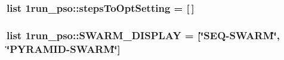 \hypertarget{namespace1run__pso_89359e300d669e1cf00ab2f5ca28347c}{
\subsubsection{\setlength{\rightskip}{0pt plus 5cm}list 1run\_\-pso::stepsToOptSetting = \mbox{[}$\,$\mbox{]}}}
\label{namespace1run__pso_89359e300d669e1cf00ab2f5ca28347c}


\hypertarget{namespace1run__pso_b9cbda5bab84f9f8207f19b9260bd6b0}{
\subsubsection{\setlength{\rightskip}{0pt plus 5cm}list 1run\_\-pso::SWARM\_\-DISPLAY = \mbox{[}\char`\"{}SEQ-SWARM\char`\"{}, \char`\"{}PYRAMID-SWARM\char`\"{}\mbox{]}}}
\label{namespace1run__pso_b9cbda5bab84f9f8207f19b9260bd6b0}


